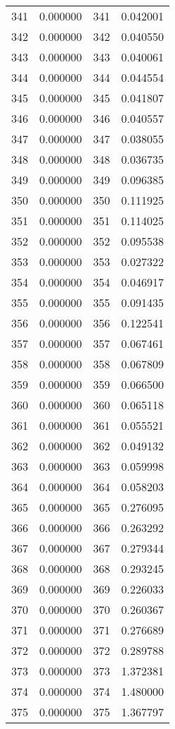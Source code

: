 \documentclass[12pt]{article}
\begin{document}
\begin{longtable}{@{}cccc@{}}
341 & 0.000000 & 341 & 0.042001 \\
342 & 0.000000 & 342 & 0.040550 \\
343 & 0.000000 & 343 & 0.040061 \\
344 & 0.000000 & 344 & 0.044554 \\
345 & 0.000000 & 345 & 0.041807 \\
346 & 0.000000 & 346 & 0.040557 \\
347 & 0.000000 & 347 & 0.038055 \\
348 & 0.000000 & 348 & 0.036735 \\
349 & 0.000000 & 349 & 0.096385 \\
350 & 0.000000 & 350 & 0.111925 \\
351 & 0.000000 & 351 & 0.114025 \\
352 & 0.000000 & 352 & 0.095538 \\
353 & 0.000000 & 353 & 0.027322 \\
354 & 0.000000 & 354 & 0.046917 \\
355 & 0.000000 & 355 & 0.091435 \\
356 & 0.000000 & 356 & 0.122541 \\
357 & 0.000000 & 357 & 0.067461 \\
358 & 0.000000 & 358 & 0.067809 \\
359 & 0.000000 & 359 & 0.066500 \\
360 & 0.000000 & 360 & 0.065118 \\
361 & 0.000000 & 361 & 0.055521 \\
362 & 0.000000 & 362 & 0.049132 \\
363 & 0.000000 & 363 & 0.059998 \\
364 & 0.000000 & 364 & 0.058203 \\
365 & 0.000000 & 365 & 0.276095 \\
366 & 0.000000 & 366 & 0.263292 \\
367 & 0.000000 & 367 & 0.279344 \\
368 & 0.000000 & 368 & 0.293245 \\
369 & 0.000000 & 369 & 0.226033 \\
370 & 0.000000 & 370 & 0.260367 \\
371 & 0.000000 & 371 & 0.276689 \\
372 & 0.000000 & 372 & 0.289788 \\
373 & 0.000000 & 373 & 1.372381 \\
374 & 0.000000 & 374 & 1.480000 \\
375 & 0.000000 & 375 & 1.367797 \\

\end{longtable}
\end{document}
